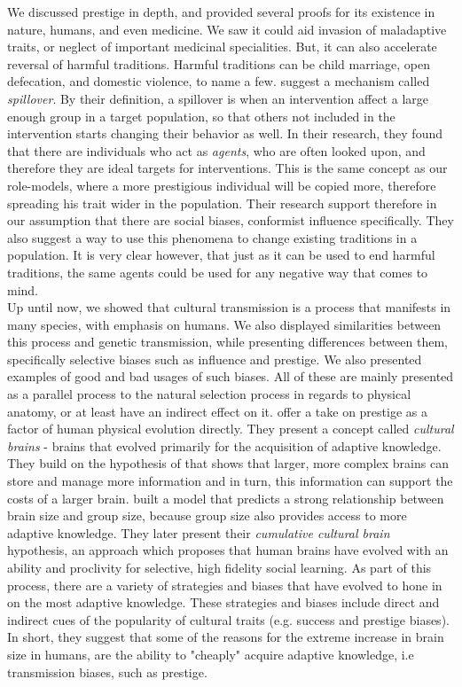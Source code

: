 \documentclass[11pt]{article}
\begin{document}
We discussed prestige in depth, and provided several proofs for its existence in nature, humans, and even medicine. We saw it could aid invasion of maladaptive traits, or neglect of important medicinal specialities. But, it can also accelerate reversal of harmful traditions.
Harmful traditions can be child marriage, open defecation, and domestic violence, to name a few. 
\citet{harmful_traditions} suggest a mechanism called \textit{spillover}. By their definition, a spillover is when an intervention affect a large enough group in a target population, so that others not included in the intervention starts changing their behavior as well. In their research, they found that there are individuals who act as \textit{agents}, who are often looked upon, and therefore they are ideal targets for interventions. This is the same concept as our role-models, where a more prestigious individual will be copied more, therefore spreading his trait wider in the population. Their research support therefore in our assumption that there are social biases, conformist influence specifically. They also suggest a way to use this phenomena to change existing traditions in a population. It is very clear however, that just as it can be used to end harmful traditions, the same agents could be used for any negative way that comes to mind.\\

Up until now, we showed that cultural transmission is a process that manifests in many species, with emphasis on humans. We also displayed similarities between this process and genetic transmission, while presenting differences between them, specifically selective biases such as influence and prestige. We also presented examples of good and bad usages of such biases. All of these are mainly presented as a parallel process to the natural selection process in regards to physical anatomy, or at least have an indirect effect on it. \citet{collective_brains} offer a take on prestige as a factor of human physical evolution directly. They present a concept called \textit{cultural brains} - brains that evolved primarily for the acquisition of adaptive knowledge.
They build on the hypothesis of \citet{social_brains} that shows that larger, more complex brains can store and manage more information and in turn, this information can support the costs of a larger brain.
\citet{collective_brains} built a model that predicts a strong relationship between brain size and group size, because group size also provides access to more adaptive knowledge. They later present their \textit{cumulative cultural brain} hypothesis, an approach which proposes that human brains have evolved with an ability and proclivity for selective, high fidelity social learning. As part of this process, there are a variety of strategies and biases that have evolved to hone in on the most adaptive knowledge. These strategies and biases include direct and indirect cues of the popularity of cultural traits (e.g. success and prestige biases).
In short, they suggest that some of the reasons for the extreme increase in brain size in humans, are the ability to "cheaply" acquire adaptive knowledge, i.e transmission biases, such as prestige.


\clearpage


\end{document}
